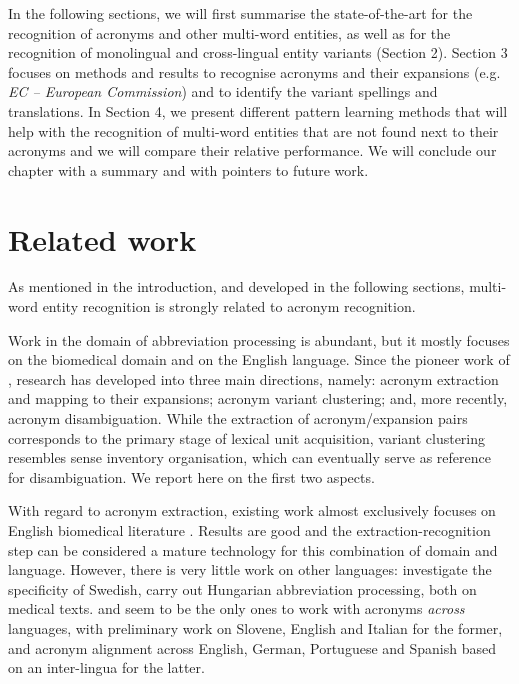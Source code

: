 \documentclass[output=paper]{langsci/langscibook}
\begin{document}
In the following sections, we will first summarise the state-of-the-art for the recognition of acronyms and other multi-word entities, as well as for the recognition of monolingual and cross-lingual entity variants (Section 2). Section 3 focuses on methods and results to recognise acronyms and their expansions (e.g. \textit{EC – European Commission}) and to identify the variant spellings and translations. In Section 4, we present different pattern learning methods that will help with the recognition of multi-word entities that are not found next to their acronyms and we will compare their relative performance. We will conclude our chapter with a summary and with pointers to future work. 

\section{Related work}
\label{soa}
As mentioned in the introduction, and developed in the following sections, multi-word entity recognition is strongly related to acronym recognition.   

Work in the domain of abbreviation processing is abundant, but it
mostly focuses on the biomedical domain and on the English
language. Since the pioneer work of \citet{taghva-99}, research has
developed into three main directions, namely: acronym extraction and
mapping to their expansions; acronym variant clustering; and, more
recently, acronym disambiguation. While the extraction of
acronym/expansion pairs corresponds to the primary stage of lexical
unit acquisition, variant clustering resembles sense inventory
organisation, which can eventually serve as reference for
disambiguation. We report here on the first two aspects.%

With regard to acronym extraction, existing work almost exclusively
focuses on English biomedical literature
\citep{schwartz-03,okazaki-06,pustejovsky-01,wren-02,adar-04,chang-02,nadeau-05}.
Results are good and the extraction-recognition step can be considered
a mature technology for this combination of domain and
language. However, there is very little work on other languages:
\citet{kokkinakis-06} investigate the specificity of Swedish,
\citet{siklosi-14} carry out Hungarian abbreviation processing, both
on medical texts.  \citet{kompara-10} and \citet{hahn-05} seem to be
the only ones to work with acronyms \textit{across} languages, with
preliminary work on Slovene, English and Italian for the former, and
acronym alignment across English, German, Portuguese and Spanish based
on an inter-lingua for the latter.
\end{document}
